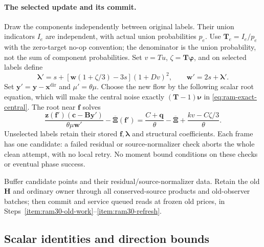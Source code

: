 \documentclass[11pt]{article}
\theoremstyle{remark}
\newcommand{\BB}{\mathbf B}
\newcommand{\HH}{\mathbf H}
\newcommand{\cc}{\mathbf c}
\newcommand{\ff}{\mathbf f}
\newcommand{\llambda}{\boldsymbol{\lambda}}
\newcommand{\ww}{\mathbf w}
\newcommand{\yy}{\mathbf y}
\newcommand{\zz}{\mathbf z}
\newcommand{\xxdir}{\mathbf{x}^{\mathrm{dir}}}
\newcommand{\XXibar}{\overline{\boldsymbol{\Xi}}}
\newcommand{\TT}{\mathbf T}
\newcommand{\qq}{\mathbf q}
\newcommand{\nnu}{\boldsymbol{\nu}}
\newcommand{\pphi}{\boldsymbol{\varphi}}
\begin{document}
\paragraph{The selected update and its commit.}
Draw the components independently between original labels.
Their union indicators $I_e$ are independent, with actual union probabilities
$p_e$.
Use $\TT_e=I_e/p_e$ with the zero-target no-op convention; the denominator is the
union probability, not the sum of component probabilities.
Set $v=Tu$, $\zeta=\TT\pphi$, and on selected labels define
\begin{equation}
 \llambda'=s+[\ww(1+\zeta/3)-3s](1+Dv)^2,
 \qquad \ww'=2s+\llambda'.
 \label{eq:ram-weight-update}
\end{equation}
Set $\yy'=\yy-\xxdir$ and $\mu'=\theta\mu$.
Choose the new flow by the following scalar root equation, which will make the
central noise exactly $(\TT-1)\nnu$ in \eqref{eq:ram-exact-central}.
The root near $\ff$ solves
\begin{equation}
 \frac{\zz(\ff')(\cc-\BB\yy')}{\theta\mu \ww'}-\XXibar(\ff')
 =\frac{C+\qq}{\theta}-\XXibar+
                          \frac{kv-C\zeta/3}{\theta}.
 \label{eq:ram-root-update}
\end{equation}
Unselected labels retain their stored $\ff,\llambda$ and structural coefficients.
Each frame has one candidate: a failed residual or source-normalizer check
aborts the whole clean attempt, with no local retry.
No moment bound conditions on these checks or eventual phase success.

Buffer candidate points and their residual/source-normalizer data.
Retain the old $\HH$ and ordinary owner through all conserved-source products and
old-observer batches; then commit and service queued reads at frozen old prices,
in Steps~\ref{item:ram30-old-work}--\ref{item:ram30-refresh}.

\subsection{Scalar identities and direction bounds}
\end{document}
